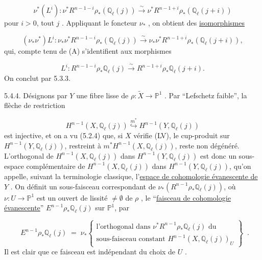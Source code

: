 \begin{equation}\tag{5.4.1}
\nu^*(L^i) : \nu^*R^{n-1-i}\rho_*(\mathbb{Q}_\ell(j)) \overset{\sim}{\longrightarrow} \nu^*R^{n-1+i}\rho_*(\mathbb{Q}_\ell(j+i))
\end{equation}
pour $i > 0$, tout $j$ . Appliquant le foncteur $\nu_*$ , on obtient des \underline{isomorphismes}

\begin{equation}\tag{5.4.2}
(\nu_*\nu^*) L^i : \nu_*\nu^* R^{n-1-i}\rho_*(\mathbb{Q}_\ell(j)) \overset{\sim}{\longrightarrow} \nu_*\nu^*R^{n-1+i}\rho_*(\mathbb{Q}_\ell(j+i)),
\end{equation}
qui, compte tenu de (A) s'identifient aux morphismes

\begin{equation}\tag{5.4.3}
L^i : R^{n-1-i}\rho_*\mathbb{Q}_\ell(j) \overset{\sim}{\longrightarrow} R^{n-1+i}\rho_*\mathbb{Q}_\ell(j+i) .
\end{equation}
On conclut par 5.3.3.

5.4.4. Désignons par $Y$ une fibre lisse de $\rho : \widetilde{X} \longrightarrow \mathbb{P}^1$ . Par ``Lefschetz faible'', la flèche de restriction

\begin{equation*}
H^{n-1}(X,\mathbb{Q}_\ell(j)) \overset{m^*}{\hookrightarrow} H^{n-1}(Y,\mathbb{Q}_\ell(j))
\end{equation*}
est injective, et on a vu (5.2.4) que, si $X$ vérifie (LV), le cup-produit sur $H^{n-1}(Y,\mathbb{Q}_\ell(j))$, restreint à $m^* H^{n-1}(X,\mathbb{Q}_\ell(j))$, reste non dégénéré. L'orthogonal de $H^{n-1}(X,\mathbb{Q}_\ell(j))$ dans $H^{n-1}(Y,\mathbb{Q}_\ell(j))$ est donc un sous-espace complémentaire de $H^{n-1}(X,\mathbb{Q}_\ell(j))$ dans $H^{n-1}(Y,\mathbb{Q}_\ell(j))$, qu'on appelle, suivant la terminologie classique, l'\underline{espace de cohomologie évanescente de} $Y$ . On définit un sous-faisceau correspondant de $\nu_*(R^{n-1}\rho_*\mathbb{Q}_\ell(j))$, où $\nu : U \longrightarrow \mathbb{P}^1$ est un ouvert de lissité $\neq \emptyset$ de $\rho$ , le ``\underline{faisceau de cohomologie évanescente}'' $E^{n-1}\rho_*\mathbb{Q}_\ell(j)$ sur $\mathbb{P}^1$, par 



\begin{equation}\tag{5.4.4.1}
 \;\; E^{n-1}\rho_*\mathbb{Q}_\ell(j) \;=\; \nu_*\left\{\begin{array}{l}\text{l'orthogonal dans } \nu^*R^{n-1}\rho_*\mathbb{Q}_\ell(j) \text{ du}\\[2ex]\text{sous-faisceau constant } H^{n-1}(X,\mathbb{Q}_\ell(j))_U\end{array}\right\} \;\;.
\end{equation}
Il est clair que ce faisceau est indépendant du choix de $U$ .

